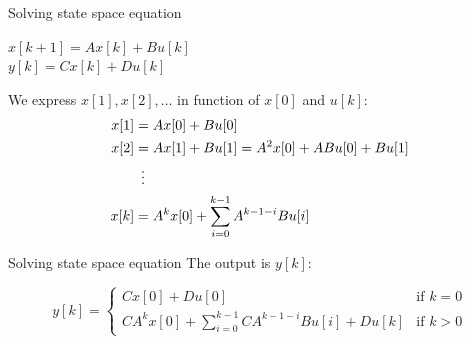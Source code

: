 \begin{frame}
	\begin{block}{Solving state space equation}
			\begin{center}
				$x[k+1] = A x[k] + B u[k]$ \\
				$y[k] = C x[k] + D u[k] $ 
			\end{center}
			We express $x[1],x[2],\dots$ in function of $x[0]$ and $u[k]$:
			\begin{align*}
					x[1] &= Ax[0]+Bu[0]\\
					x[2] &= Ax[1] + Bu[1] = A^2x[0]+ABu[0]+ Bu[1]\\
					&\hspace{0.5em} \vdots\\
					x[k] &= A^kx[0] + \sum\limits_{i=0}^{k-1} A^{k-1-i}Bu[i]
			\end{align*}
	\end{block}
\end{frame}
\begin{frame}
	\begin{block}{Solving state space equation}
			The output is $y[k]$:
			\vspace{-2.5em}
			\begin{center}
				\[ y[k] = \begin{cases} Cx[0] + Du[0] & \text{if }  k = 0 \\
				 CA^kx[0]+\sum\limits_{i=0 }^{k-1} CA^{k  -1  -i}Bu[i] +D u[k] & \text{if } k > 0 \end{cases} \]
			\end{center}
	\end{block}
\end{frame}
